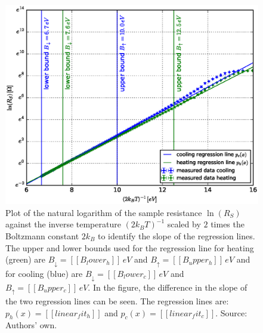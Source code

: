 \documentclass[a4paper]{article}
\begin{document}

\begin{figure}[H]
\captionsetup{singlelinecheck=off}
\centering
\includegraphics[width=1.0\textwidth]{plots/energy_gap.eps}
\caption[blubb]{Plot of the natural logarithm of the sample resistance $\ln{\left( R_S \right)}$ against the inverse temperature $\left(2 k_B T \right)^{-1}$ scaled by $2$ times the Boltzmann constant $2 k_B$ to identify the slope of the regression lines. The upper and lower bounds used for the regression line for heating (green) are $B_{\downarrow} = [[B_lower_h]] \, eV$ and $B_{\uparrow} = [[B_upper_h]] \, eV$ and for cooling (blue) are $B_{\downarrow} = [[B_lower_c]] \, eV$ and $B_{\uparrow} = [[B_upper_c]] \, eV$. In the figure, the difference in the slope of the two regression lines can be seen. The regression lines are: $p_h(x) = [[linear_fit_h]]$ and $p_c(x) = [[linear_fit_c]]$. Source: Authors' own.}
\label{fig:energy_gap}
\end{figure}
\end{document}
